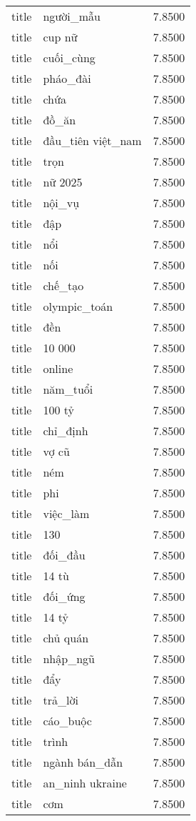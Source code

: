 \documentclass{article}
\begin{document}
\begin{tabular}{lll}
title & người\_mẫu & 7.8500\\
title & cup nữ & 7.8500\\
title & cuối\_cùng & 7.8500\\
title & pháo\_đài & 7.8500\\
title & chứa & 7.8500\\
title & đồ\_ăn & 7.8500\\
title & đầu\_tiên việt\_nam & 7.8500\\
title & trọn & 7.8500\\
title & nữ 2025 & 7.8500\\
title & nội\_vụ & 7.8500\\
title & đập & 7.8500\\
title & nổi & 7.8500\\
title & nối & 7.8500\\
title & chế\_tạo & 7.8500\\
title & olympic\_toán & 7.8500\\
title & đền & 7.8500\\
title & 10 000 & 7.8500\\
title & online & 7.8500\\
title & năm\_tuổi & 7.8500\\
title & 100 tỷ & 7.8500\\
title & chỉ\_định & 7.8500\\
title & vợ cũ & 7.8500\\
title & ném & 7.8500\\
title & phi & 7.8500\\
title & việc\_làm & 7.8500\\
title & 130 & 7.8500\\
title & đối\_đầu & 7.8500\\
title & 14 tù & 7.8500\\
title & đối\_ứng & 7.8500\\
title & 14 tỷ & 7.8500\\
title & chủ quán & 7.8500\\
title & nhập\_ngũ & 7.8500\\
title & đẩy & 7.8500\\
title & trả\_lời & 7.8500\\
title & cáo\_buộc & 7.8500\\
title & trình & 7.8500\\
title & ngành bán\_dẫn & 7.8500\\
title & an\_ninh ukraine & 7.8500\\
title & cơm & 7.8500\\

\end{tabular}
\end{document}

